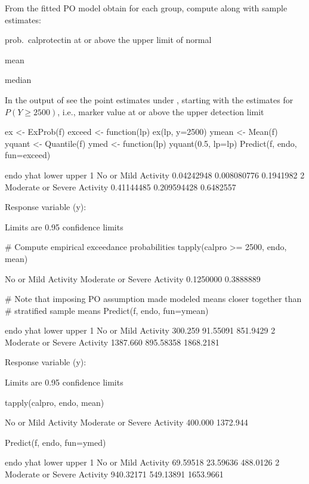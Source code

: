 \item From the fitted PO model obtain for each group, compute along with sample estimates:
 \bi
 \item prob.\ calprotectin at or above the upper limit of normal
 \item mean
 \item median
 \ei
\item In the output of  see the point estimates under , starting with the estimates for $P(Y \geq 2500)$, i.e., marker value at or above the upper detection limit
\begin{Schunk}
\begin{Sinput}
ex <- ExProb(f)
exceed <- function(lp) ex(lp, y=2500)
ymean  <- Mean(f)
yquant <- Quantile(f)
ymed   <- function(lp) yquant(0.5, lp=lp)
Predict(f, endo, fun=exceed)
\end{Sinput}
\begin{Soutput}
                         endo       yhat       lower     upper
1         No or Mild Activity 0.04242948 0.008080776 0.1941982
2 Moderate or Severe Activity 0.41144485 0.209594428 0.6482557

Response variable (y):  

Limits are 0.95 confidence limits
\end{Soutput}
\begin{Sinput}
# Compute empirical exceedance probabilities
tapply(calpro >= 2500, endo, mean)
\end{Sinput}
\begin{Soutput}
        No or Mild Activity Moderate or Severe Activity 
                  0.1250000                   0.3888889 
\end{Soutput}
\begin{Sinput}
# Note that imposing PO assumption made modeled means closer together than
# stratified sample means
Predict(f, endo, fun=ymean)
\end{Sinput}
\begin{Soutput}
                         endo     yhat     lower     upper
1         No or Mild Activity  300.259  91.55091  851.9429
2 Moderate or Severe Activity 1387.660 895.58358 1868.2181

Response variable (y):  

Limits are 0.95 confidence limits
\end{Soutput}
\begin{Sinput}
tapply(calpro, endo, mean)
\end{Sinput}
\begin{Soutput}
        No or Mild Activity Moderate or Severe Activity 
                    400.000                    1372.944 
\end{Soutput}
\begin{Sinput}
Predict(f, endo, fun=ymed)
\end{Sinput}
\begin{Soutput}
                         endo      yhat     lower     upper
1         No or Mild Activity  69.59518  23.59636  488.0126
2 Moderate or Severe Activity 940.32171 549.13891 1653.9661


\end{Soutput}
\end{Schunk}

